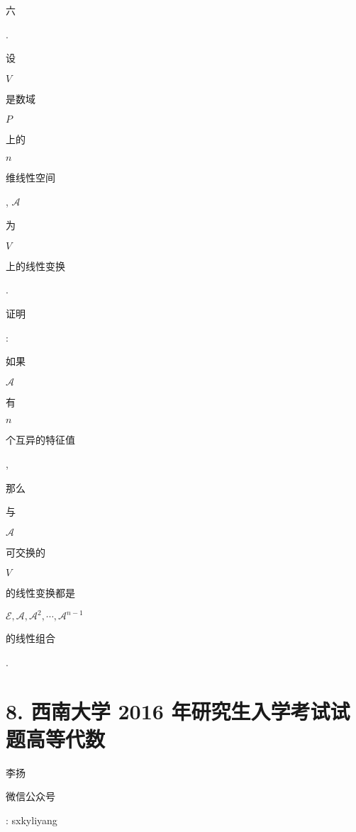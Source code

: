 \documentclass[10pt]{article}
\begin{document}
\begin{CJK}{UTF8}{mj}六\end{CJK}. \begin{CJK}{UTF8}{mj}设\end{CJK} $V$ \begin{CJK}{UTF8}{mj}是数域\end{CJK} $P$ \begin{CJK}{UTF8}{mj}上的\end{CJK} $n$ \begin{CJK}{UTF8}{mj}维线性空间\end{CJK}, $\mathscr{A}$ \begin{CJK}{UTF8}{mj}为\end{CJK} $V$ \begin{CJK}{UTF8}{mj}上的线性变换\end{CJK}. \begin{CJK}{UTF8}{mj}证明\end{CJK}: \begin{CJK}{UTF8}{mj}如果\end{CJK} $\mathscr{A}$ \begin{CJK}{UTF8}{mj}有\end{CJK} $n$ \begin{CJK}{UTF8}{mj}个互异的特征值\end{CJK}, \begin{CJK}{UTF8}{mj}那么\end{CJK} \begin{CJK}{UTF8}{mj}与\end{CJK} $\mathscr{A}$ \begin{CJK}{UTF8}{mj}可交换的\end{CJK} $V$ \begin{CJK}{UTF8}{mj}的线性变换都是\end{CJK} $\mathscr{E}, \mathscr{A}, \mathscr{A}^{2}, \cdots, \mathscr{A}^{n-1}$ \begin{CJK}{UTF8}{mj}的线性组合\end{CJK}.

\section{8. 西南大学 2016 年研究生入学考试试题高等代数}
\begin{CJK}{UTF8}{mj}李扬\end{CJK}

\begin{CJK}{UTF8}{mj}微信公众号\end{CJK}: sxkyliyang
\end{document}
